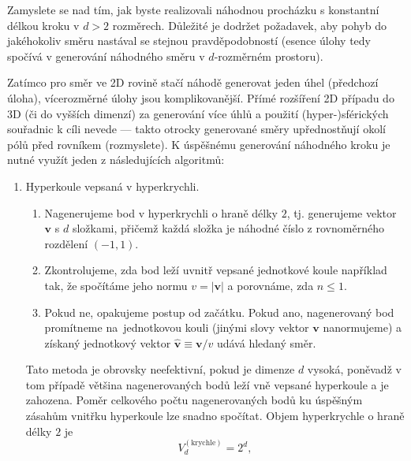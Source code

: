 \documentclass[a4paper,11pt,twoside]{article}
\def\vector#1{\boldsymbol{#1}}								%
\def\abs#1{\left|#1\right|}
\begin{document}
    \begin{task}\label{task:RandomWalk}
        Zamyslete se nad tím, jak byste realizovali náhodnou procházku s konstantní délkou kroku v $d>2$ rozměrech.
        Důležité je dodržet požadavek, aby pohyb do jakéhokoliv směru nastával se stejnou pravděpodobností (esence úlohy tedy spočívá v generování náhodného směru v $d$-rozměrném prostoru).
    \end{task}

    \begin{solution}
        Zatímco pro směr ve 2D rovině stačí náhodě generovat jeden úhel (předchozí úloha), vícerozměrné úlohy jsou komplikovanější.
        Přímé rozšíření 2D případu do 3D (či do vyšších dimenzí) za generování více úhlů a použití (hyper-)sférických souřadnic k cíli nevede --- takto otrocky generované směry upřednostňují okolí pólů před rovníkem (rozmyslete).
        K úspěšnému generování náhodného kroku je nutné využít jeden z následujících algoritmů:
        \begin{enumerate}
            \item Hyperkoule vepsaná v hyperkrychli.
                \begin{enumerate}
                    \item Nagenerujeme bod v hyperkrychli o hraně délky $2$, tj. generujeme vektor $\vector{v}$ s $d$ složkami, přičemž každá složka je náhodné číslo z rovnoměrného rozdělení $(-1,1)$.
                    \item Zkontrolujeme, zda bod leží uvnitř vepsané jednotkové koule například tak, že spočítáme jeho normu $v=\abs{\vector{v}}$ a porovnáme, zda $n\leq1$.
                    \item Pokud ne, opakujeme postup od začátku.
                        Pokud ano, nagenerovaný bod promítneme na~jednotkovou kouli (jinými slovy vektor $\vector{v}$ nanormujeme) a získaný jednotkový vektor $\vector{\hat{v}}\equiv\vector{v}/v$ udává hledaný směr. 
                \end{enumerate}
                Tato metoda je obrovsky neefektivní, pokud je dimenze $d$ vysoká, poněvadž v tom případě většina nagenerovaných bodů leží vně vepsané hyperkoule a je zahozena.
                Poměr celkového počtu nagenerovaných bodů ku úspěšným zásahům vnitřku hyperkoule lze snadno spočítat.
                Objem hyperkrychle o hraně délky $2$ je
                \begin{equation}
                    V_{d}^{(\text{krychle})}=2^{d},
                \end{equation}

\end{enumerate}
\end{solution}
\end{document}
